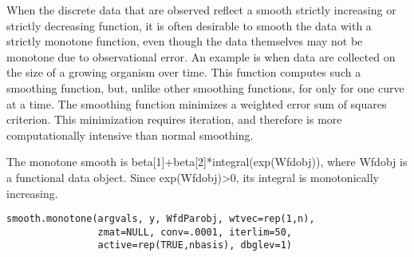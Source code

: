 \begin{Description}\relax
When the discrete data that are observed reflect a smooth strictly
increasing or strictly decreasing function, it is often desirable to
smooth the data with a strictly monotone function, even though the
data themselves may not be monotone due to observational error.  An
example is when data are collected on the size of a growing organism
over time.  This function computes such a smoothing function, but,
unlike other smoothing functions, for only for one curve at a time.
The smoothing function minimizes a weighted error sum of squares
criterion.  This minimization requires iteration, and therefore is
more computationally intensive than normal smoothing.

The monotone smooth is beta[1]+beta[2]*integral(exp(Wfdobj)), where
Wfdobj is a functional data object.  Since exp(Wfdobj)>0, its integral
is monotonically increasing.
\end{Description}
\begin{Usage}
\begin{verbatim}
smooth.monotone(argvals, y, WfdParobj, wtvec=rep(1,n),
                zmat=NULL, conv=.0001, iterlim=50,
                active=rep(TRUE,nbasis), dbglev=1)
\end{verbatim}
\end{Usage}
